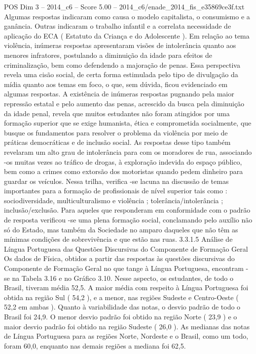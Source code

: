 \begin{textsample}{POS Dim 3 – 2014\_c6 – Score 5.00 – 2014\_c6/enade\_2014\_fis\_e35869ce3f.txt}
Algumas respostas indicaram como causa o modelo capitalista, o consumismo e a ganância.
Outras indicaram o trabalho infantil e a correlata necessidade de aplicação do ECA ( Estatuto da Criança e do Adolescente ).
Em relação ao tema violência, inúmeras respostas apresentaram visões de intolerância quanto aos menores infratores, postulando a diminuição da idade para efeitos de criminalização, bem como defendendo a majoração de penas.
Essa perspectiva revela uma cisão social, de certa forma estimulada pelo tipo de divulgação da mídia quanto aos temas em foco, o que, sem dúvida, ficou evidenciado em algumas respostas.
A existência de inúmeras respostas pugnando pela maior repressão estatal e pelo aumento das penas, acrescido da busca pela diminuição da idade penal, revela que muitos estudantes não foram atingidos por uma formação superior que se exige humanista, ética e comprometida socialmente, que busque os fundamentos para resolver o problema da violência por meio de práticas democráticas e de inclusão social.
As respostas desse tipo também revelaram um alto grau de intolerância para com os moradores de rua, associando -os muitas vezes ao tráfico de drogas, à exploração indevida do espaço público, bem como a crimes como extorsão dos motoristas quando pedem dinheiro para guardar os veículos.
Nessa trilha, verifica -se lacuna na discussão de temas importantes para a formação de profissionais de nível superior tais como : sociodiversidade, multiculturalismo e violência ; tolerância/intolerância ; inclusão/exclusão.
Para aqueles que responderam em conformidade com o padrão de resposta verificou -se uma plena formação social, conclamando pelo auxílio não só do Estado, mas também da Sociedade no amparo daqueles que não têm as mínimas condições de sobrevivência e que estão nas ruas. 3.3.1.5 Análise de Língua Portuguesa das Questões Discursivas do Componente de Formação Geral Os dados de Física, obtidos a partir das respostas às questões discursivas do Componente de Formação Geral no que tange à Língua Portuguesa, encontram -se na Tabela 3.16 e no Gráfico 3.10.
Nesse aspecto, os estudantes, de todo o Brasil, tiveram média 52,5.
A maior média com respeito à Língua Portuguesa foi obtida na região Sul ( 54,2 ), e a menor, nas regiões Sudeste e Centro-Oeste ( 52,2 em ambas ).
Quanto à variabilidade das notas, o desvio padrão de todo o Brasil foi 24,9.
O menor desvio padrão foi obtido na região Norte ( 23,9 ) e o maior desvio padrão foi obtido na região Sudeste ( 26,0 ).
As medianas das notas de Língua Portuguesa para as regiões Norte, Nordeste e o Brasil, como um todo, foram 60,0, enquanto nas demais regiões a mediana foi 62,5.

\end{textsample}
